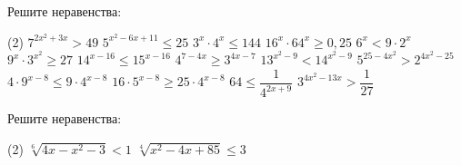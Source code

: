 \begin{class}[number=2]
	\begin{listofex}
		\item Решите неравенства: %
		\begin{tasks}(2)
			\task \( 7^{2x^2+3x}>49 \)
			\task \( 5^{x^2-6x+11} \le 25 \)
			\task \( 3^x \cdot 4^x  \le 144 \)
			\task \( 16^x \cdot 64^x \ge 0,25 \)
			\task \( 6^x < 9 \cdot 2^x \)
			\task \( 9^x \cdot 3^{x^2} \ge 27 \)
			\task \( 14^{x-16} \le 15^{x-16} \)
			\task \( 4^{7-4x} \ge 3^{4x-7} \)
			\task \( 13^{x^2-9}<14^{x^2-9} \)
			\task \( 5^{25-4x^2}>2^{4x^2-25} \)
			\task \( 4 \cdot 9^{x-8} \le 9 \cdot 4^{x-8} \)
			\task \( 16 \cdot 5^{x-8} \ge 25 \cdot 4^{x-8} \)
			\task \( 64 \le \dfrac{ 1 }{ 4^{2x+9} } \)
			\task \( 3^{4x^2-13x}>\dfrac{ 1 }{ 27 } \)
		\end{tasks}
		\item Решите неравенства:
		\begin{tasks}(2)
			\task \( \sqrt[6]{4x-x^2-3}<1 \)
			\task \( \sqrt[4]{x^2-4x+85}\le 3 \)
		\end{tasks}
	\end{listofex}
\end{class}
